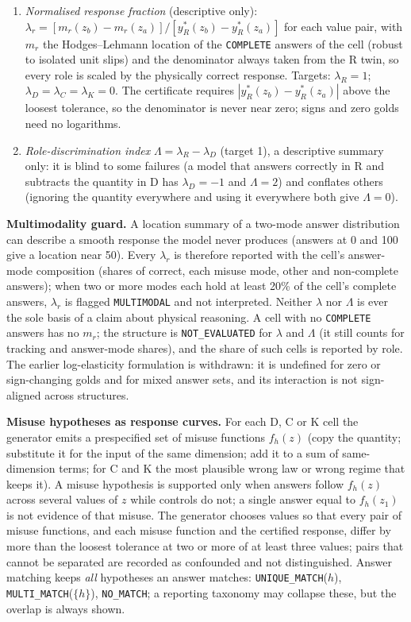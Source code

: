 \documentclass[10pt,a4paper]{article}
\newcommand{\NE}{\texttt{NOT\_EVALUATED}}
\begin{document}
\begin{enumerate}
of its prediction stated in advance.
\item \emph{Normalised response fraction} (descriptive only): $\lambda_r=[m_r(z_b)-m_r(z_a)]/[y^*_R(z_b)-y^*_R(z_a)]$ for
each value pair, with $m_r$ the Hodges--Lehmann location of the \texttt{COMPLETE} answers of the cell (robust to
isolated unit slips) and the denominator always taken from the R twin, so every role is scaled by the physically
correct response. Targets: $\lambda_R=1$; $\lambda_D=\lambda_C=\lambda_K=0$. The certificate requires
$|y^*_R(z_b)-y^*_R(z_a)|$ above the loosest tolerance, so the denominator is never near zero; signs and zero golds
need no logarithms.
\item \emph{Role-discrimination index} $\Lambda=\lambda_R-\lambda_D$ (target 1), a descriptive summary only: it
is blind to some failures (a model that answers correctly in R and subtracts the quantity in D has $\lambda_D=-1$ and
$\Lambda=2$) and conflates others (ignoring the quantity everywhere and using it everywhere both give $\Lambda=0$).
\end{enumerate}
\textbf{Multimodality guard.} A location summary of a two-mode answer distribution can describe a smooth response
the model never produces (answers at 0 and 100 give a location near 50). Every $\lambda_r$ is therefore reported
with the cell's answer-mode composition (shares of correct, each misuse mode, other and non-complete answers); when
two or more modes each hold at least 20\% of the cell's complete answers, $\lambda_r$ is flagged \texttt{MULTIMODAL}
and not interpreted. Neither $\lambda$ nor $\Lambda$ is ever the sole basis of a claim about physical reasoning.
A cell with no \texttt{COMPLETE} answers has no $m_r$; the structure is \NE{} for $\lambda$ and $\Lambda$ (it still
counts for tracking and answer-mode shares), and the share of such cells is reported by role. The earlier log-elasticity formulation is
withdrawn: it is undefined for zero or sign-changing golds and for mixed answer sets, and its interaction is not
sign-aligned across structures.

\textbf{Misuse hypotheses as response curves.} For each D, C or K cell the generator emits a prespecified set of
misuse functions $f_h(z)$ (copy the quantity; substitute it for the input of the same dimension; add it to a sum
of same-dimension terms; for C and K the most plausible wrong law or wrong regime that keeps it). A misuse
hypothesis is supported only when answers follow $f_h(z)$ across several values of $z$ while controls do not; a
single answer equal to $f_h(z_1)$ is not evidence of that misuse. The generator chooses values so that every pair of
misuse functions, and each misuse function and the certified response, differ by more than the loosest tolerance at
two or more of at least three values; pairs that cannot be separated are recorded as confounded and not
distinguished. Answer matching keeps \emph{all} hypotheses an
answer matches: \texttt{UNIQUE\_MATCH}($h$), \texttt{MULTI\_MATCH}($\{h\}$), \texttt{NO\_MATCH}; a reporting
taxonomy may collapse these, but the overlap is always shown.
\end{document}
